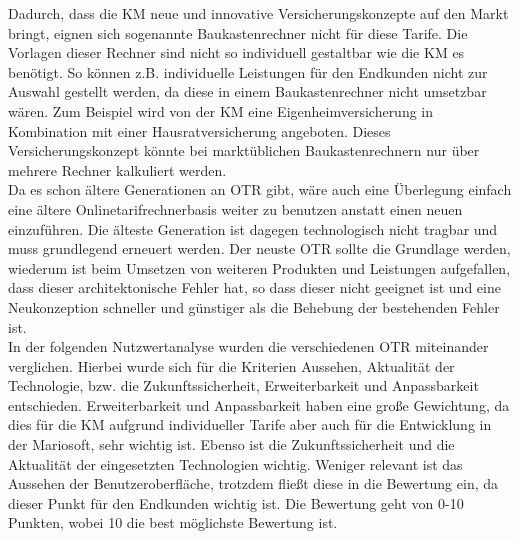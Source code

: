 Dadurch, dass die \ac{KM} neue und innovative Versicherungskonzepte auf den Markt bringt, eignen sich sogenannte Baukastenrechner nicht für diese Tarife. Die Vorlagen dieser Rechner sind nicht so individuell gestaltbar wie die \ac{KM} es benötigt. So können z.B. individuelle Leistungen für den Endkunden nicht zur Auswahl gestellt werden, da diese in einem Baukastenrechner nicht umsetzbar wären. Zum Beispiel wird von der \ac{KM} eine Eigenheimversicherung in Kombination mit einer Hausratversicherung angeboten. Dieses Versicherungskonzept könnte bei marktüblichen Baukastenrechnern nur über mehrere Rechner kalkuliert werden.\\
Da es schon ältere Generationen an \ac{OTR} gibt, wäre auch eine Überlegung einfach eine ältere Onlinetarifrechnerbasis weiter zu benutzen anstatt einen neuen einzuführen. Die älteste Generation ist dagegen technologisch nicht tragbar und muss grundlegend erneuert werden. Der neuste \ac{OTR} sollte die Grundlage werden, wiederum ist beim Umsetzen von weiteren Produkten und Leistungen aufgefallen, dass dieser architektonische Fehler hat, so dass dieser nicht geeignet ist und eine Neukonzeption schneller und günstiger als die Behebung der bestehenden Fehler ist.\\
In der folgenden Nutzwertanalyse wurden die verschiedenen \ac{OTR} miteinander verglichen. Hierbei wurde sich für die Kriterien Aussehen, Aktualität der Technologie, bzw. die Zukunftssicherheit, Erweiterbarkeit und Anpassbarkeit entschieden. Erweiterbarkeit und Anpassbarkeit haben eine große Gewichtung, da dies für die \ac{KM} aufgrund individueller Tarife aber auch für die Entwicklung in der Mariosoft, sehr wichtig ist. Ebenso ist die Zukunftssicherheit und die Aktualität der eingesetzten Technologien wichtig. Weniger relevant ist das Aussehen der Benutzeroberfläche, trotzdem fließt diese in die Bewertung ein, da dieser Punkt für den Endkunden wichtig ist. Die Bewertung geht von 0-10 Punkten, wobei 10 die best möglichste Bewertung ist.\\

